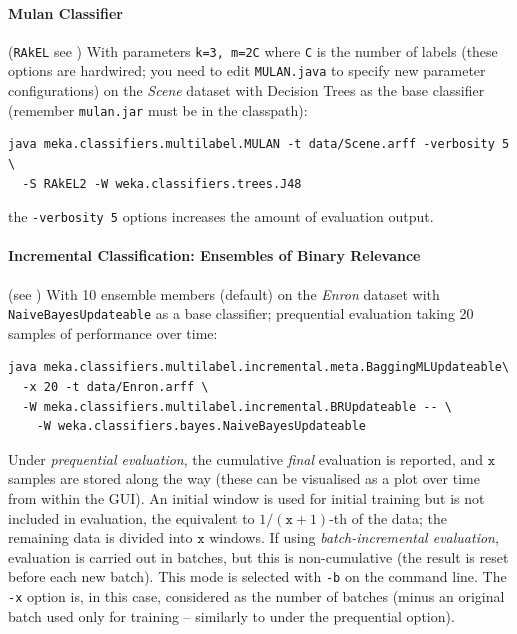 \documentclass[11pt]{article}
\begin{document}
\paragraph{Mulan Classifier} (\texttt{RAkEL} see \cite{RAKEL}) With parameters \texttt{\texttt{k=3}, \texttt{m=2C}} where \texttt{C} is the number of labels (these options are hardwired; you need to edit \texttt{MULAN.java} to specify new parameter configurations) on the \textit{Scene} dataset with Decision Trees as the base classifier (remember {\texttt{mulan.jar} must be in the classpath}):
\begin{lstlisting}
java meka.classifiers.multilabel.MULAN -t data/Scene.arff -verbosity 5 \ 
  -S RAkEL2 -W weka.classifiers.trees.J48
\end{lstlisting}
the \texttt{-verbosity 5} options increases the amount of evaluation output.



\paragraph{Incremental Classification: Ensembles of Binary Relevance} (see \cite{ECC2,MEDS2}) With 10 ensemble members (default) on the \textit{Enron} dataset with \texttt{NaiveBayesUpdateable} as a base classifier; prequential evaluation taking 20 samples of performance over time:

\begin{lstlisting}
java meka.classifiers.multilabel.incremental.meta.BaggingMLUpdateable\
  -x 20 -t data/Enron.arff \
  -W meka.classifiers.multilabel.incremental.BRUpdateable -- \
    -W weka.classifiers.bayes.NaiveBayesUpdateable
\end{lstlisting}

Under \emph{prequential evaluation}, the cumulative \emph{final} evaluation is reported, and $\texttt{x}$ samples are stored along the way (these can be visualised as a plot over time from within the GUI). An initial window is used for initial training but is not included in evaluation, the equivalent to $1/(\texttt{x}+1)$-th of the data; the remaining data is divided into $\texttt{x}$ windows. If using \emph{batch-incremental evaluation}, evaluation is carried out in batches, but this is non-cumulative (the result is reset before each new batch). This mode is selected with \texttt{-b} on the command line. The \texttt{-x} option is, in this case, considered as the number of batches (minus an original batch used only for training -- similarly to under the prequential option).
\end{document}
